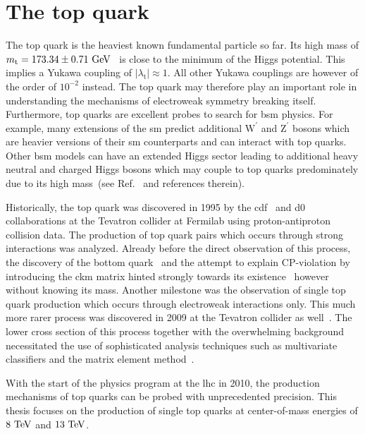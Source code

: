 \section{The top quark}

The top quark is the heaviest known fundamental particle so far. Its high mass of $m_\mathrm{t}=173.34\pm0.71~\mathrm{GeV}$~\cite{ATLAS:2014wva} is close to the minimum of the Higgs potential. This implies a Yukawa coupling of $|\lambda_\mathrm{t}|\approx 1$. All other Yukawa couplings are however of the order of $10^{-2}$ instead. The top quark may therefore play an important role in understanding the mechanisms of electroweak symmetry breaking itself. Furthermore, top quarks are excellent probes to search for \gls{bsm} physics. For example, many extensions of the \gls{sm} predict additional $\mathrm{W}^{\prime}$ and $\mathrm{Z}^{\prime}$ bosons which are heavier versions of their \gls{sm} counterparts and can interact with top quarks. Other \gls{bsm} models can have an extended Higgs sector leading to additional heavy neutral and charged Higgs bosons which may couple to top quarks predominately due to its high mass~(see Ref.~\cite{Boos:2006xe} and references therein).  

Historically, the top quark was discovered in 1995 by the \gls{cdf}~\cite{Abe:1995hr} and \gls{d0}~\cite{Abachi:1994td} collaborations at the Tevatron collider at Fermilab using proton-antiproton collision data. The production of top quark pairs which occurs through strong interactions was analyzed. Already before the direct observation of this process, the discovery of the bottom quark~\cite{Augustin:1975yq,PhysRevLett.39.252} and the attempt to explain CP-violation by introducing the \gls{ckm} matrix hinted strongly towards its existence~\cite{Kobayashi01021973} however without knowing its mass. Another milestone was the observation of single top quark production which occurs through electroweak interactions only. This much more rarer process was discovered in 2009 at the Tevatron collider as well~\cite{PhysRevLett.103.092002,PhysRevLett.103.092001}. The lower cross section of this process together with the overwhelming background necessitated the use of sophisticated analysis techniques such as multivariate classifiers and the matrix element method~\cite{Mitrevski}.

With the start of the physics program at the \gls{lhc} in 2010, the production mechanisms of top quarks can be probed with unprecedented precision. This thesis focuses on the production of single top quarks at center-of-mass energies of $8~\mathrm{TeV}$ and $13~\mathrm{TeV}$.


